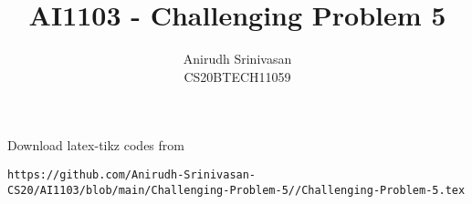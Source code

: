 \documentclass[journal,12pt,twocolumn]{IEEEtran}
\theoremstyle{definition}
\DeclareMathOperator*{\Res}{Res}
\begin{document}
\newcommand{\BEQA}{\begin{eqnarray}}
\newcommand{\EEQA}{\end{eqnarray}}
\newcommand{\define}{\stackrel{\triangle}{=}}

\raggedbottom
\setlength{\parindent}{0pt}
\providecommand{\mbf}{\mathbf}
\providecommand{\pr}[1]{\ensuremath{\Pr\left(#1\right)}}
\providecommand{\qfunc}[1]{\ensuremath{Q\left(#1\right)}}
\providecommand{\sbrak}[1]{\ensuremath{{}\left[#1\right]}}
\providecommand{\lsbrak}[1]{\ensuremath{{}\left[#1\right.}}
\providecommand{\rsbrak}[1]{\ensuremath{{}\left.#1\right]}}
\providecommand{\brak}[1]{\ensuremath{\left(#1\right)}}
\providecommand{\lbrak}[1]{\ensuremath{\left(#1\right.}}
\providecommand{\rbrak}[1]{\ensuremath{\left.#1\right)}}
\providecommand{\cbrak}[1]{\ensuremath{\left\{#1\right\}}}
\providecommand{\lcbrak}[1]{\ensuremath{\left\{#1\right.}}
\providecommand{\rcbrak}[1]{\ensuremath{\left.#1\right\}}}
\theoremstyle{remark}
\newtheorem{rem}{Remark}
\newcommand{\sgn}{\mathop{\mathrm{sgn}}}
\newcommand*{\permcomb}[4][0mu]{{{}^{#3}\mkern#1#2_{#4}}}
\newcommand*{\perm}[1][-3mu]{\permcomb[#1]{P}}
\newcommand*{\comb}[1][-1mu]{\permcomb[#1]{C}}
\providecommand{\abs}[1]{\vert#1\vert}
\providecommand{\res}[1]{\Res\displaylimits_{#1}} 
\providecommand{\norm}[1]{\lVert#1\rVert}
\providecommand{\mtx}[1]{\mathbf{#1}}
\providecommand{\mean}[1]{E[ #1 ]}
\providecommand{\fourier}{\overset{\mathcal{F}}{ \rightleftharpoons}}
\providecommand{\system}{\overset{\mathcal{H}}{ \longleftrightarrow}}
\newcommand{\solution}{\noindent \textbf{Solution: }}
\newcommand{\cosec}{\,\text{cosec}\,}
\providecommand{\dec}[2]{\ensuremath{\overset{#1}{\underset{#2}{\gtrless}}}}
\newcommand{\myvec}[1]{\ensuremath{\begin{pmatrix}#1\end{pmatrix}}}
\newcommand{\mydet}[1]{\ensuremath{\begin{vmatrix}#1\end{vmatrix}}}
\makeatletter
{}
\makeatother
\let\StandardTheFigure\thefigure
\let\vec\mathbf
\renewcommand{\thefigure}{\theproblem}
\def\putbox#1#2#3{\makebox[0in][l]{\makebox[#1][l]{}\raisebox{\baselineskip}[0in][0in]{\raisebox{#2}[0in][0in]{#3}}}}
     \def\rightbox#1{\makebox[0in][r]{#1}}
     \def\centbox#1{\makebox[0in]{#1}}
     \def\topbox#1{\raisebox{-\baselineskip}[0in][0in]{#1}}
     \def\midbox#1{\raisebox{-0.5\baselineskip}[0in][0in]{#1}}
\vspace{3cm}
\title{AI1103 - Challenging Problem 5}
\author{Anirudh Srinivasan\\CS20BTECH11059}
\maketitle
\newpage
\bigskip
\renewcommand{\thefigure}{\theenumi}
\renewcommand{\thetable}{\theenumi}
Download latex-tikz codes from 
%
\begin{lstlisting}
https://github.com/Anirudh-Srinivasan-CS20/AI1103/blob/main/Challenging-Problem-5//Challenging-Problem-5.tex
\end{lstlisting}
\end{document}

